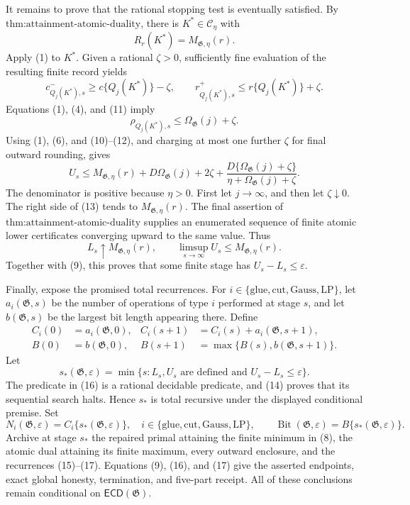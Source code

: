 It remains to prove that the rational stopping test is eventually satisfied.  By \(\text{thm:attainment-atomic-duality}\), there is \(K^*\in\mathcal C_\eta\) with
\[
 R_r(K^*)=M_{\mathfrak G,\eta}(r).
 \tag{10}
\]
Apply (1) to \(K^*\).  Given a rational \(\zeta>0\), sufficiently fine evaluation of the resulting finite record yields
\[
 c^-_{Q_j(K^*),s}\ge c\{Q_j(K^*)\}-\zeta,
 \qquad
 r^+_{Q_j(K^*),s}\le r\{Q_j(K^*)\}+\zeta.
 \tag{11}
\]
Equations (1), (4), and (11) imply
\[
 \rho_{Q_j(K^*),s}\le\Omega_{\mathfrak G}(j)+\zeta.
 \tag{12}
\]
Using (1), (6), and (10)--(12), and charging at most one further \(\zeta\) for final outward rounding, gives
\[
 U_s\le M_{\mathfrak G,\eta}(r)
 +D\Omega_{\mathfrak G}(j)+2\zeta
 +\frac{D\{\Omega_{\mathfrak G}(j)+\zeta\}}
 {\eta+\Omega_{\mathfrak G}(j)+\zeta}.
 \tag{13}
\]
The denominator is positive because \(\eta>0\).  First let \(j\to\infty\), and then let \(\zeta\downarrow0\).  The right side of (13) tends to \(M_{\mathfrak G,\eta}(r)\).  The final assertion of \(\text{thm:attainment-atomic-duality}\) supplies an enumerated sequence of finite atomic lower certificates converging upward to the same value.  Thus
\[
 L_s\uparrow M_{\mathfrak G,\eta}(r),
 \qquad
 \limsup_{s\to\infty}U_s\le M_{\mathfrak G,\eta}(r).
 \tag{14}
\]
Together with (9), this proves that some finite stage has \(U_s-L_s\le\varepsilon\).

Finally, expose the promised total recurrences.  For \(i\in\{\mathrm{glue},\mathrm{cut},\mathrm{Gauss},\mathrm{LP}\}\), let \(a_i(\mathfrak G,s)\) be the number of operations of type \(i\) performed at stage \(s\), and let \(b(\mathfrak G,s)\) be the largest bit length appearing there.  Define
\[
 \begin{aligned}
 C_i(0)&=a_i(\mathfrak G,0),&
 C_i(s+1)&=C_i(s)+a_i(\mathfrak G,s+1),\\
 B(0)&=b(\mathfrak G,0),&
 B(s+1)&=\max\{B(s),b(\mathfrak G,s+1)\}.
 \end{aligned}
 \tag{15}
\]
Let
\[
 s_*(\mathfrak G,\varepsilon)
 =\min\{s:L_s,U_s\text{ are defined and }U_s-L_s\le\varepsilon\}.
 \tag{16}
\]
The predicate in (16) is a rational decidable predicate, and (14) proves that its sequential search halts.  Hence \(s_*\) is total recursive under the displayed conditional premise.  Set
\[
 N_i(\mathfrak G,\varepsilon)=C_i\{s_*(\mathfrak G,\varepsilon)\},
 \quad i\in\{\mathrm{glue},\mathrm{cut},\mathrm{Gauss},\mathrm{LP}\},
 \qquad
 \operatorname{Bit}(\mathfrak G,\varepsilon)=B\{s_*(\mathfrak G,\varepsilon)\}.
 \tag{17}
\]
Archive at stage \(s_*\) the repaired primal attaining the finite minimum in (8), the atomic dual attaining its finite maximum, every outward enclosure, and the recurrences (15)--(17).  Equations (9), (16), and (17) give the asserted endpoints, exact global honesty, termination, and five-part receipt.  All of these conclusions remain conditional on \(\mathsf{ECD}(\mathfrak G)\).

